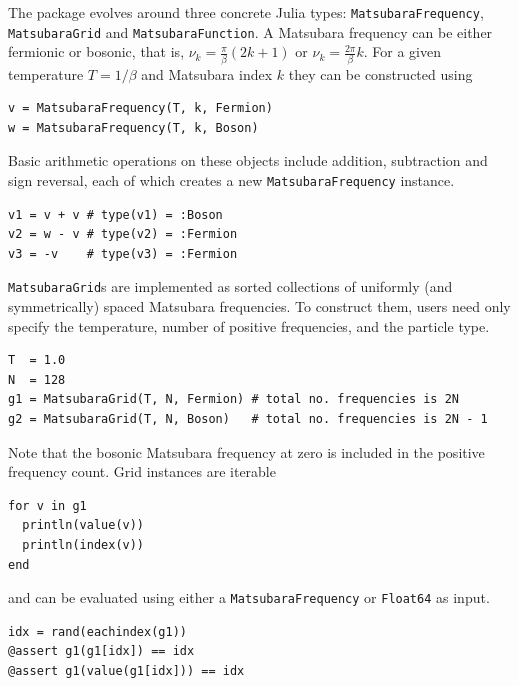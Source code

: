 \documentclass{SciPost}
\begin{document}
The package evolves around three concrete Julia types: \texttt{MatsubaraFrequency}, \texttt{MatsubaraGrid} and \texttt{MatsubaraFunction}. A Matsubara frequency can be either fermionic or bosonic, that is, $\nu_k = \tfrac{\pi}{\beta} (2 k + 1)$ or $\nu_k = \tfrac{2\pi}{\beta} k$. For a given temperature $T = 1 / \beta$ and Matsubara index $k$ they can be constructed using
%
\begin{verbatim}
v = MatsubaraFrequency(T, k, Fermion)
w = MatsubaraFrequency(T, k, Boson) 
\end{verbatim}
%
Basic arithmetic operations on these objects include addition, subtraction and sign reversal, each of which creates a new \texttt{MatsubaraFrequency} instance.
%
\begin{verbatim}
v1 = v + v # type(v1) = :Boson
v2 = w - v # type(v2) = :Fermion
v3 = -v    # type(v3) = :Fermion 
\end{verbatim}
%
\texttt{MatsubaraGrid}s are implemented as sorted collections of uniformly (and symmetrically) spaced Matsubara frequencies. To construct them, users need only specify the temperature, number of positive frequencies, and the particle type.
%
\begin{verbatim}
T  = 1.0
N  = 128
g1 = MatsubaraGrid(T, N, Fermion) # total no. frequencies is 2N
g2 = MatsubaraGrid(T, N, Boson)   # total no. frequencies is 2N - 1
\end{verbatim}
%
Note that the bosonic Matsubara frequency at zero is included in the positive frequency count. Grid instances are iterable
%
\begin{verbatim}
for v in g1
  println(value(v)) 
  println(index(v))
end
\end{verbatim}
%
and can be evaluated using either a \texttt{MatsubaraFrequency} or \texttt{Float64} as input.
%
\begin{verbatim}
idx = rand(eachindex(g1))
@assert g1(g1[idx]) == idx 
@assert g1(value(g1[idx])) == idx 
\end{verbatim}
\end{document}
